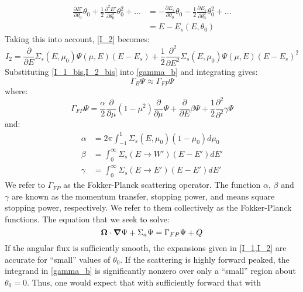 \begin{equation}
\begin{split}
\frac{\partial E'}{\partial \theta_0}\theta_0 + \frac{1}{2}\frac{\partial^2
E'}{\partial \theta_0^2}\theta_0^2 +\hdots &= -\frac{\partial E_s}{\partial
\theta_0} \theta_0 - \frac{1}{2} \frac{\partial E_s}{\partial
\theta_0^2}\theta_0^2+\hdots\\
&= E-E_s(E,\theta_0) 
\end{split}
\end{equation}
Taking this into account, \cref{I_2} becomes:
\begin{equation}
I_2 = \frac{\partial}{\partial E}\Sigma_s(E,\mu_0) \Psi(\mu,E) (E-E_s) +
\frac{1}{2}\frac{\partial^2}{\partial E^2} \Sigma_s(E,\mu_0) \Psi(\mu,E)
(E-E_s)^2
\label{I_2_bis}
\end{equation}
Substituting \cref{I_1_bis,I_2_bis} into \cref{gamma_b} and integrating gives:
\begin{equation}
\Gamma_B \Psi \approx \Gamma_{FP} \Psi
\end{equation}
where:
\begin{equation}
\Gamma_{FP}\Psi = \frac{\alpha}{2} \frac{\partial}{\partial \mu} (1-\mu^2)
\frac{\partial}{\partial \mu} \Psi + \frac{\partial}{\partial E} \beta \Psi +
\frac{1}{2}\frac{\partial^2}{\partial^2}\gamma \Psi
\label{gamma_fp}
\end{equation}
and:
\begin{align}
\alpha &= 2\pi \int_{-1}^1 \Sigma_s(E,\mu_0) (1-\mu_0) d\mu_0 \label{alpha}\\
\beta &= \int_0^{\infty} \Sigma_s(E\rightarrow W') (E-E') dE' \label{beta}\\
\gamma &= \int_0^{\infty} \Sigma_s(E\rightarrow E') (E-E') dE' \label{gamma}
\end{align}
We refer to $\Gamma_{FP}$ as the Fokker-Planck scattering operator. The
function $\alpha$, $\beta$ and $\gamma$ are known as the momentum transfer,
stopping power, and means square stopping power, respectively. We refer to
them collectively as the Fokker-Planck functions. The equation that we seek to
solve:
\begin{equation}
\boldsymbol{\Omega}\cdot\boldsymbol{\nabla}\Psi +\Sigma_a \Psi = \Gamma_{FP} \Psi+Q
\end{equation}
If the angular flux is sufficiently smooth, the expansions given in \cref{I_1,I_2} 
are accurate for ``small'' values of $\theta_0$.
If the scattering is highly forward peaked, the integrand in \cref{gamma_b} is 
significantly nonzero over only a ``small'' region about
$\theta_0=0$. Thus, one would expect that with sufficiently forward that with
